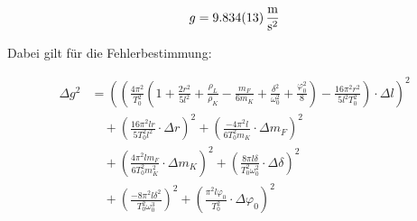 \[g = \SI{9,834 \pm 0,013}{\frac{\meter}{\second^2}}\]

Dabei gilt für die Fehlerbestimmung:

\begin{align}
\Delta g^{2} 
&= \left( 
    \left( 
        \frac{4\pi^{2}}{T_{0}^{2}}
        \left( 
            1 + \frac{2r^{2}}{5l^{2}} + \frac{\rho_{L}}{\rho_{K}} 
            - \frac{m_{F}}{6m_{K}} + \frac{\delta^{2}}{\omega_{0}^{2}} 
            + \frac{\varphi_{0}^{2}}{8} 
        \right) 
        - \frac{16\pi^{2}r^{2}}{5l^{2}T_{0}^{2}} 
    \right) \cdot \Delta l 
\right)^{2} \\[1ex]
&\quad + \left( 
    \frac{16\pi^{2}lr}{5T_{0}^{2}l^{2}} \cdot \Delta r 
\right)^{2} 
+ \left( 
    \frac{-4\pi^{2}l}{6T_{0}^{2}m_{K}} \cdot \Delta m_{F} 
\right)^{2} \\[1ex]
&\quad + \left( 
    \frac{4\pi^{2}lm_{F}}{6T_{0}^{2}m_{K}^{2}} \cdot \Delta m_{K} 
\right)^{2} 
+ \left( 
    \frac{8\pi l \delta}{T_{0}^{2}\omega_{0}^{2}} \cdot \Delta \delta 
\right)^{2} \\[1ex]
&\quad + \left( 
    \frac{-8\pi^{2}l\delta^{2}}{T_{0}^{2}\omega_{0}^{3}} 
\right)^{2} 
+ \left( 
    \frac{\pi^{2}l\varphi_{0}}{T_{0}^{2}} \cdot \Delta \varphi_{0} 
\right)^{2}
\end{align}
